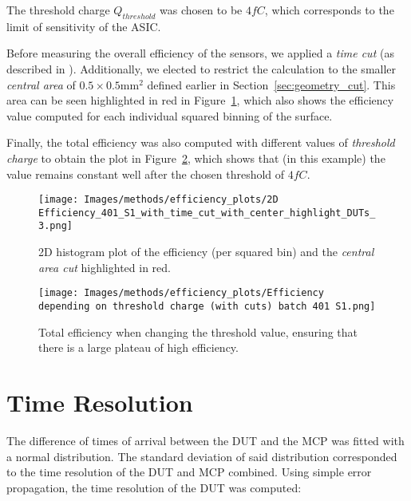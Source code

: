The threshold charge \(Q_{threshold}\) was chosen to be \(4\si{fC}\), which corresponds to the limit of sensitivity of the ASIC.

Before measuring the overall efficiency of the sensors, we applied a \textit{time cut} (as described in ). Additionally, we elected to restrict the calculation to the smaller \textit{central area} of \(0.5\times0.5\unit{\milli\meter^2}\) defined earlier in Section~\ref{sec:geometry_cut}. This area can be seen highlighted in red in Figure~\ref{fig:efficiency_2D_plot}, which also shows the efficiency value computed for each individual squared binning of the surface.

Finally, the total efficiency was also computed with different values of \textit{threshold charge} to obtain the plot in Figure~\ref{fig:efficiency_depending_threshold}, which shows that (in this example) the value remains constant well after the chosen threshold of \(4\si{fC}\).

\begin{figure}[h!tbp]
    \centering
    \texttt{[image: Images/methods/efficiency\_plots/2D Efficiency\_401\_S1\_with\_time\_cut\_with\_center\_highlight\_DUTs\_3.png]}
    \captionsetup{width=\captionwidth}
    \caption{2D histogram plot of the efficiency (per squared bin) and the \textit{central area cut} highlighted in red.}
    \label{fig:efficiency_2D_plot}
\end{figure}

\begin{figure}[h!tbp]
    \centering
    \texttt{[image: Images/methods/efficiency\_plots/Efficiency depending on threshold charge (with cuts) batch 401 S1.png]}
    \caption{Total efficiency when changing the threshold value, ensuring that there is a large plateau of high efficiency.}
    \label{fig:efficiency_depending_threshold}
\end{figure}


\section{Time Resolution}\label{sec:methods_time_resolution}

The difference of times of arrival between the DUT and the MCP was fitted with a normal distribution. The standard deviation of said distribution corresponded to the time resolution of the DUT and MCP combined. Using simple error propagation, the time resolution of the DUT was computed: 

